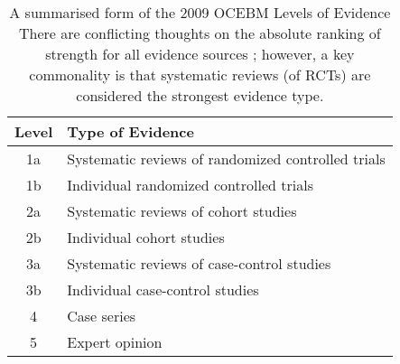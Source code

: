 \begin{table}[ht]
\centering
\small
\begin{adjustbox}{width=\columnwidth}
\begin{tabular}{|c|l|}
\hline
\textbf{Level} & \textbf{Type of Evidence} \\
\hline
1a & Systematic reviews of randomized controlled trials \\
1b & Individual randomized controlled trials \\
2a & Systematic reviews of cohort studies \\
2b & Individual cohort studies \\
3a & Systematic reviews of case-control studies \\
3b & Individual case-control studies \\
4 & Case series \\
5 & Expert opinion \\
\hline
\end{tabular}
\end{adjustbox}

\caption[A summarised form of the 2009 OCEBM Levels of Evidence]{A summarised form of the 2009 OCEBM Levels of Evidence \cite{noauthor_oxford_nodate} There are conflicting thoughts on the absolute ranking of strength for all evidence sources \cite{swanson_how_2010, guyatt_grade_2008}; however, a key commonality is that systematic reviews (of RCTs) are considered the strongest evidence type.}
\label{tab:evidence_levels}
\end{table}